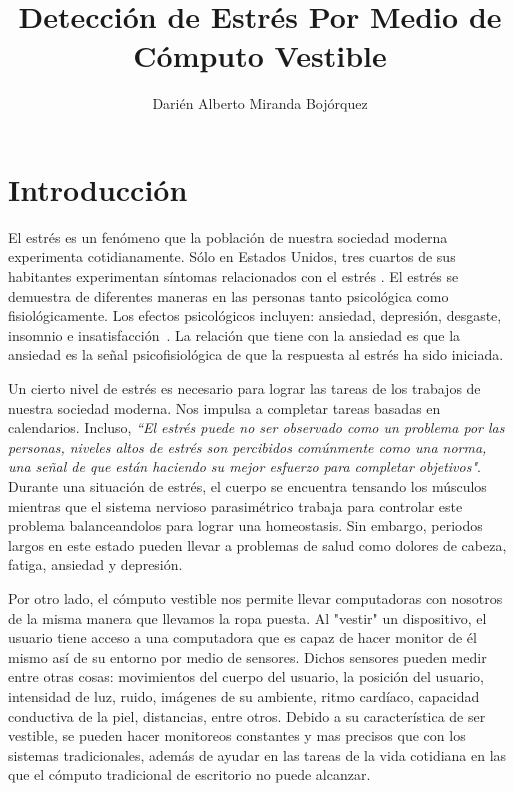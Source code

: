 \documentclass[letterpaper,12pt]{cicese}
\begin{document}
	\doublespace
	\title{Detecci\'on de Estr\'es Por Medio de C\'omputo Vestible}
	\author{Dari\'en Alberto Miranda Boj\'orquez}
	\maketitle
	\newpage
	\tableofcontents
	\newpage

		\chapter{Introducci\'on} 
			El estr\'es es un fen\'omeno que la poblaci\'on de nuestra sociedad moderna experimenta cotidianamente. S\'olo en Estados Unidos, tres cuartos de sus
			habitantes experimentan s\'intomas relacionados con el estr\'es \citep{Lu2012}. El estr\'es se demuestra de diferentes maneras en las personas tanto psicol\'ogica
			como fisiol\'ogicamente. Los efectos psicol\'ogicos incluyen: ansiedad, depresi\'on, desgaste, insomnio e insatisfacci\'on \citep{Sebastian2013556}. La relaci\'on que tiene
			con la ansiedad es que la ansiedad es la se\~nal psicofisiol\'ogica de que la respuesta al estr\'es ha sido iniciada.\citep{PMID2235645}
			
			
			Un cierto  nivel de estr\'es es necesario para lograr las tareas de los trabajos de nuestra sociedad moderna. Nos impulsa a completar tareas basadas en 
			calendarios. Incluso, \emph{``El estr\'es puede no ser observado como un problema por las personas, niveles altos de estr\'es  son percibidos com\'unmente 
			como una norma, una se\~nal de que est\'an  haciendo su mejor esfuerzo para completar objetivos"}\citep{Bakker2012SMS}. Durante una situaci\'on de estr\'es, el cuerpo se encuentra
			tensando los m\'usculos mientras que el sistema nervioso parasim\'etrico trabaja para controlar este problema balanceandolos para lograr una homeostasis\citep{Ayzenberg2012}. Sin
			embargo, periodos largos en este estado pueden llevar a problemas de salud como dolores de cabeza, fatiga, ansiedad y depresi\'on.

			Por otro lado, el c\'omputo vestible nos permite llevar computadoras con nosotros de la misma manera que llevamos la ropa puesta. Al "vestir" un dispositivo,
			el usuario tiene acceso a una computadora que es capaz de hacer monitor de \'el mismo as\'i de su entorno por medio de sensores. Dichos sensores pueden medir entre
			otras cosas: movimientos del cuerpo del usuario, la posici\'on del usuario, intensidad de luz, ruido, im\'agenes de su ambiente, ritmo card\'iaco, capacidad
			conductiva de la piel, distancias, entre otros. Debido a su caracter\'istica de ser vestible, se pueden hacer monitoreos constantes y mas precisos que con
			los sistemas tradicionales, adem\'as de ayudar en las tareas de la vida cotidiana en las que el c\'omputo tradicional de escritorio no puede alcanzar.
			
\end{document}
